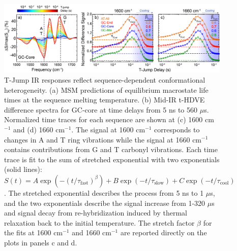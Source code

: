 \documentclass[journal=jpcbfk,manuscript=article]{achemso}
\begin{document}
\begin{figure}[ht!]
	\begin{center} 
        \includegraphics[width=1.0\textwidth]{Fig5.pdf}
        \caption{T-Jump IR responses reflect sequence-dependent conformational heterogeneity. (a) MSM predictions of equilibrium macrostate life times at the sequence melting temperature. (b) Mid-IR t-HDVE difference spectra for GC-core at time delays from 5 ns to 560 $\mu$s. Normalized time traces for each sequence are shown at (c) 1600 cm$^{-1}$ and (d) 1660 cm$^{-1}$. The signal at 1600 cm$^{-1}$ corresponds to changes in A and T ring vibrations while the signal at 1660 cm$^{-1}$ contains contributions from G and T carbonyl vibrations. Each time trace is fit to the sum of stretched exponential with two exponentials (solid lines): $S(t) = A\exp{(-(t/\tau_{\mathrm{fast}})^{\beta})} + B\exp{(-t/\tau_{\mathrm{slow}})}+C\exp{(-t/\tau_{\mathrm{cool}})}$. The stretched exponential describes the process from 5 ns to 1 $\mu$s, and the two exponentials describe the signal increase from 1-320 $\mu$s and signal decay from re-hybridization induced by thermal relaxation back to the initial temperature. The stretch factor $\beta$ for the fits at 1600 cm$^{-1}$ and 1660 cm$^{-1}$ are reported directly on the plots in panels c and d.
        }
        \label{fig:T-jump_stretching}
	\end{center}
\end{figure}

   
 
   

\end{document}
